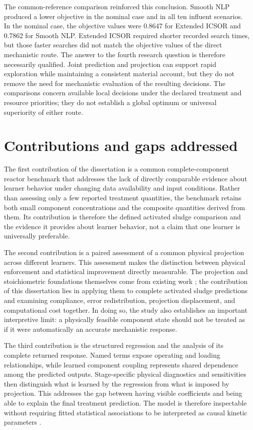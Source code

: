 The common-reference comparison reinforced this conclusion. Smooth NLP produced a lower objective in the nominal case and in all ten influent scenarios. In the nominal case, the objective values were 0.8647 for Extended ICSOR and 0.7862 for Smooth NLP. Extended ICSOR required shorter recorded search times, but those faster searches did not match the objective values of the direct mechanistic route. The answer to the fourth research question is therefore necessarily qualified. Joint prediction and projection can support rapid exploration while maintaining a consistent material account, but they do not remove the need for mechanistic evaluation of the resulting decisions. The comparisons concern available local decisions under the declared treatment and resource priorities; they do not establish a global optimum or universal superiority of either route.

\section{Contributions and gaps addressed}
\label{sec:assessment_conclusions}

The first contribution of the dissertation is a common complete-component reactor benchmark that addresses the lack of directly comparable evidence about learner behavior under changing data availability and input conditions. Rather than assessing only a few reported treatment quantities, the benchmark retains both small component concentrations and the composite quantities derived from them. Its contribution is therefore the defined activated sludge comparison and the evidence it provides about learner behavior, not a claim that one learner is universally preferable.

The second contribution is a paired assessment of a common physical projection across different learners. This assessment makes the distinction between physical enforcement and statistical improvement directly measurable. The projection and stoichiometric foundations themselves come from existing work \citep{SturmWexler2022,KircherVotsmeier2025}; the contribution of this dissertation lies in applying them to complete activated sludge predictions and examining compliance, error redistribution, projection displacement, and computational cost together. In doing so, the study also establishes an important interpretive limit: a physically feasible component state should not be treated as if it were automatically an accurate mechanistic response.

The third contribution is the structured regression and the analysis of its complete returned response. Named terms expose operating and loading relationships, while learned component coupling represents shared dependence among the predicted outputs. Stage-specific physical diagnostics and sensitivities then distinguish what is learned by the regression from what is imposed by projection. This addresses the gap between having visible coefficients and being able to explain the final treatment prediction. The model is therefore inspectable without requiring fitted statistical associations to be interpreted as causal kinetic parameters \citep{Selerio2026}.

